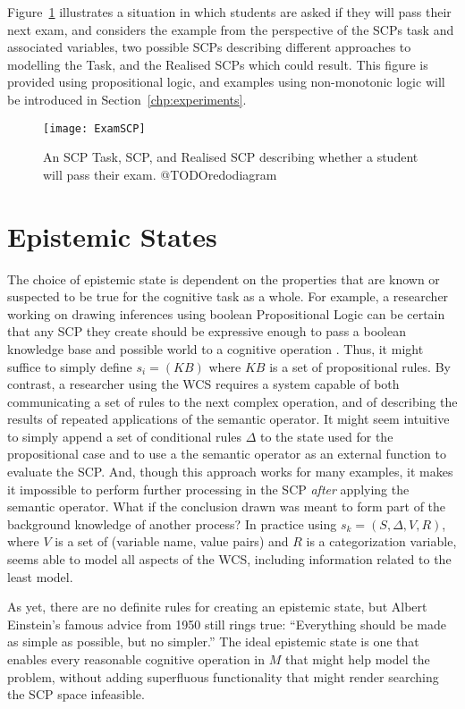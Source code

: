 Figure~\ref{fig:scpExam} illustrates a situation in which students are asked if they will pass their next exam, and considers the example from the perspective of the SCPs task and associated variables, two possible SCPs describing different approaches to modelling the Task, and the Realised SCPs which could result. This figure is provided using propositional logic, and examples using non-monotonic logic will be introduced in Section~\ref{chp:experiments}.

\begin{figure}
\begin{center}
\texttt{[image: ExamSCP]}
\end{center}
\caption{An SCP Task, SCP, and Realised SCP describing whether a student will pass their exam. @TODOredodiagram}
\label{fig:scpExam}
\end{figure}

\section{Epistemic States}
The choice of epistemic state is dependent on the properties that are known or suspected to be true for the cognitive task as a whole. For example, a researcher working on drawing inferences using boolean Propositional Logic can be certain that any SCP they create should be expressive enough to pass a boolean knowledge base and possible world to a cognitive operation . Thus, it might suffice to simply define $s_i=(KB)$ where $KB$ is a set of propositional rules. By contrast, a researcher using the WCS requires a system capable of both communicating a set of rules to the next complex operation, and of describing the results of repeated applications of the semantic operator. It might seem intuitive to simply append a set of conditional rules $\Delta$ to the state used for the propositional case and to use a the semantic operator as an external function to evaluate the SCP. And, though this approach works for many examples, it makes it impossible to perform further processing in the SCP \textit{after} applying the semantic operator. What if the conclusion drawn was meant to form part of the background knowledge of another process? In practice using $s_k=(S,\Delta,V, R)$, where $V$ is a set of (variable name, value pairs) and $R$ is a categorization variable, seems able to model all aspects of the WCS, including information related to the least model. 

As yet, there are no definite rules for creating an epistemic state, but Albert Einstein's famous advice from 1950 still rings true: ``Everything should be made as simple as possible, but no simpler.'' The ideal epistemic state is one that enables every reasonable cognitive operation in $M$ that might help model the problem, without adding superfluous functionality that might render searching the SCP space infeasible.

